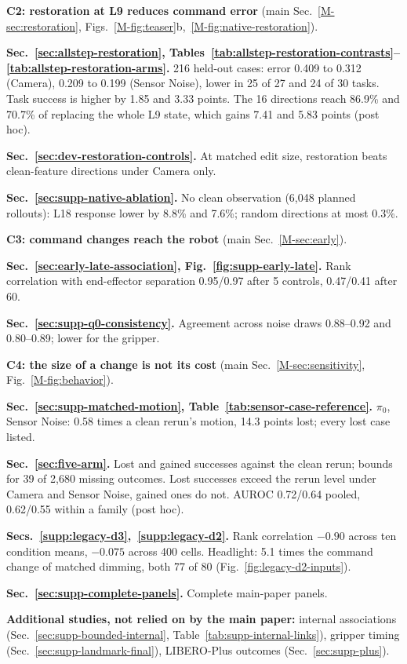 \textbf{C2: restoration at L9 reduces command error} (main Sec.~\ref{M-sec:restoration}, Figs.~\ref{M-fig:teaser}b,~\ref{M-fig:native-restoration}).
\begin{guidelist}
\item \textbf{Sec.~\ref{sec:allstep-restoration}, Tables~\ref{tab:allstep-restoration-contrasts}--\ref{tab:allstep-restoration-arms}.} 216 held-out cases: error 0.409 to 0.312 (Camera), 0.209 to 0.199 (Sensor Noise), lower in 25 of 27 and 24 of 30 tasks. Task success is higher by 1.85 and 3.33 points. The 16 directions reach 86.9\% and 70.7\% of replacing the whole L9 state, which gains 7.41 and 5.83 points (post hoc).
\item \textbf{Sec.~\ref{sec:dev-restoration-controls}.} At matched edit size, restoration beats clean-feature directions under Camera only.
\item \textbf{Sec.~\ref{sec:supp-native-ablation}.} No clean observation (6,048 planned rollouts): L18 response lower by 8.8\% and 7.6\%; random directions at most 0.3\%.
\end{guidelist}
\textbf{C3: command changes reach the robot} (main Sec.~\ref{M-sec:early}).
\begin{guidelist}
\item \textbf{Sec.~\ref{sec:early-late-association}, Fig.~\ref{fig:supp-early-late}.} Rank correlation with end-effector separation 0.95/0.97 after 5 controls, 0.47/0.41 after 60.
\item \textbf{Sec.~\ref{sec:supp-q0-consistency}.} Agreement across noise draws 0.88--0.92 and 0.80--0.89; lower for the gripper.
\end{guidelist}
\textbf{C4: the size of a change is not its cost} (main Sec.~\ref{M-sec:sensitivity}, Fig.~\ref{M-fig:behavior}).
\begin{guidelist}
\item \textbf{Sec.~\ref{sec:supp-matched-motion}, Table~\ref{tab:sensor-case-reference}.} $\pi_0$, Sensor Noise: 0.58 times a clean rerun's motion, 14.3 points lost; every lost case listed.
\item \textbf{Sec.~\ref{sec:five-arm}.} Lost and gained successes against the clean rerun; bounds for 39 of 2,680 missing outcomes. Lost successes exceed the rerun level under Camera and Sensor Noise, gained ones do not. AUROC 0.72/0.64 pooled, 0.62/0.55 within a family (post hoc).
\item \textbf{Secs.~\ref{supp:legacy-d3},~\ref{supp:legacy-d2}.} Rank correlation $-0.90$ across ten condition means, $-0.075$ across 400 cells. Headlight: 5.1 times the command change of matched dimming, both 77 of 80 (Fig.~\ref{fig:legacy-d2-inputs}).
\item \textbf{Sec.~\ref{sec:supp-complete-panels}.} Complete main-paper panels.
\end{guidelist}
\textbf{Additional studies, not relied on by the main paper:} internal associations (Sec.~\ref{sec:supp-bounded-internal}, Table~\ref{tab:supp-internal-links}), gripper timing (Sec.~\ref{sec:supp-landmark-final}), LIBERO-Plus outcomes (Sec.~\ref{sec:supp-plus}).

